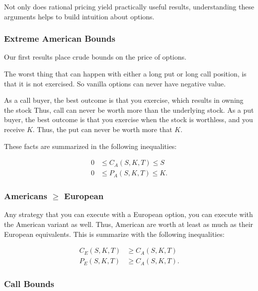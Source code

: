 \documentclass[11pt,]{krantz}
\begin{document}
Not only does rational pricing yield practically useful results, understanding these arguments helps to build intuition about options.

\subsubsection*{Extreme American Bounds}\label{extreme-american-bounds}

Our first results place crude bounds on the price of options.

The worst thing that can happen with either a long put or long call position, is that it is not exercised. So vanilla options can never have negative value.

As a call buyer, the best outcome is that you exercise, which results in owning the stock Thus, call can never be worth more than the underlying stock. As a put buyer, the best outcome is that you exercise when the stock is worthless, and you receive \(K\). Thus, the put can never be worth more that \(K\).

These facts are summarized in the following inequalities:

\begin{align*}
0 &\leq C_A(S, K, T) \leq S \\
0 &\leq P_A(S, K, T) \leq K.
\end{align*}

\subsubsection*{\texorpdfstring{Americans \(\geq\) European}{Americans \textbackslash{}geq European}}\label{americans-geq-european}

Any strategy that you can execute with a European option, you can execute with the American variant as well. Thus, American are worth at least as much as their European equivalents. This is summarize with the following inequalities:

\begin{align*}
C_E(S, K, T) &\geq C_A(S, K, T) \\
P_E(S, K, T) &\geq C_A(S, K, T).
\end{align*}

\subsubsection*{Call Bounds}\label{call-bounds}
\end{document}
